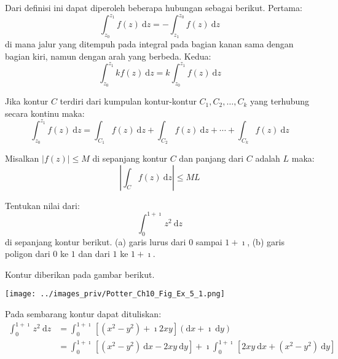 Dari definisi ini dapat diperoleh beberapa hubungan sebagai berikut.
Pertama:
\begin{equation}
\int_{z_{0}}^{z_{1}}f(z)\ \mathrm{d}z=-\int_{z_{1}}^{z_{0}}f(z)\ \mathrm{d}z
\end{equation}
di mana jalur yang ditempuh pada integral pada bagian kanan sama dengan bagian kiri,
namun dengan arah yang berbeda.
Kedua:
\begin{equation}
\int_{z_{0}}^{z_{1}}kf(z)\ \mathrm{d}z = k \int_{z_{0}}^{z_{1}}f(z)\ \mathrm{d}z
\end{equation}

Jika kontur $C$ terdiri dari kumpulan kontur-kontur $C_{1},C_{2},\ldots,C_{k}$
yang terhubung secara kontinu maka:
\begin{equation*}
\int_{z_{0}}^{z_{1}}f(z)\ \mathrm{d}z =
\int_{C_{1}}f(z)\ \mathrm{d}z + \int_{C_{2}}f(z)\ \mathrm{d}z + \cdots +
\int_{C_{k}}f(z)\ \mathrm{d}z
\end{equation*}

\begin{theorem}
Misalkan $\left| f(z) \right| \leq M$ di sepanjang kontur $C$ dan panjang
dari $C$ adalah $L$ maka:
\begin{equation*}
\left|\int_{C}f(z)\ \mathrm{d}z\right|\leq ML
\end{equation*}
\end{theorem}



\begin{contoh}
Tentukan nilai dari:
\begin{equation*}
\int_{0}^{1 + \imath} z^{2}\ \mathrm{d}z    
\end{equation*}
di sepanjang kontur berikut. (a) garis lurus dari $0$ sampai $1+\imath$,
(b) garis poligon dari $0$ ke $1$ dan dari $1$ ke $1+\imath$.
\end{contoh}

Kontur diberikan pada gambar berikut.

{\centering
\texttt{[image: ../images\_priv/Potter\_Ch10\_Fig\_Ex\_5\_1.png]}
\par}

Pada sembarang kontur dapat dituliskan:
\begin{align*}
\int_{0}^{1+\imath}z^{2}\ \mathrm{d}z & = \int_{0}^{1 + \imath}
\left[ \left( x^{2}-y^{2} \right) + \imath 2xy \right]
\left( \mathrm{d}x +\imath\ \mathrm{d}y \right) \\
 & =\int_{0}^{1 + \imath} \left[ \left( x^{2}-y^{2} \right)\ \mathrm{d}x -
 2xy\ \mathrm{d}y \right] + \imath \int_{0}^{1 + \imath}
 \left[ 2xy\ \mathrm{d}x + \left(x^{2}-y^{2} \right)\ \mathrm{d}y\right]
\end{align*}

